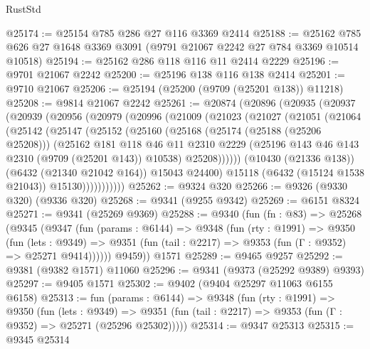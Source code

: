 \begin{lexlean}{RustStd}
\begin{coremodule}
@25174 := @25154 @785 @286 @27 @116 @3369 @2414
@25188 := @25162 @785 @626 @27 @1648 @3369 @3091 (@9791 @21067 @2242 @27 @784 @3369 @10514 @10518)
@25194 := @25162 @286 @118 @116 @11 @2414 @2229
@25196 := @9701 @21067 @2242
@25200 := @25196 @138 @116 @138 @2414
@25201 := @9710 @21067
@25206 := @25194 (@25200 (@9709 (@25201 @138)) @11218)
@25208 := @9814 @21067 @2242
@25261 := @20874
    (@20896
      (@20935
        (@20937
          (@20939
            (@20956
              (@20979
                (@20996
                  (@21009
                    (@21023
                      (@21027
                        (@21051
                          (@21064
                            (@25142
                              (@25147
                                (@25152
                                  (@25160
                                    (@25168
                                      (@25174 (@25188 (@25206 @25208)))
                                      (@25162
                                        @181
                                        @118
                                        @46
                                        @11
                                        @2310
                                        @2229
                                        (@25196 @143 @46 @143 @2310 (@9709 (@25201 @143)) @10538)
                                        @25208))))))
                            (@10430 (@21336 @138))
                            (@6432 (@21340 @21042 @164))
                            @15043
                            @24400)
                          @15118
                          (@6432 (@15124 @1538 @21043))
                          @15130)))))))))))
@25262 := @9324 @320
@25266 := @9326 (@9330 @320) (@9336 @320)
@25268 := @9341 (@9255 @9342)
@25269 := @6151 @8324
@25271 := @9341 (@25269 @9369)
@25288 := @9340
    (fun (fn : @83) =>
    @25268
      (@9345
        (@9347
          (fun (params : @6144) =>
          @9348
            (fun (rty : @1991) =>
            @9350
              (fun (lets : @9349) =>
              @9351 (fun (tail : @2217) => @9353 (fun (Γ : @9352) => @25271 @9414))))))
        @9459))
    @1571
@25289 := @9465 @9257
@25292 := @9381 (@9382 @1571) @11060
@25296 := @9341 (@9373 (@25292 @9389) @9393)
@25297 := @9405 @1571
@25302 := @9402 (@9404 @25297 @11063 @6155 @6158)
@25313 := fun (params : @6144) =>
  @9348
    (fun (rty : @1991) =>
    @9350
      (fun (lets : @9349) =>
      @9351 (fun (tail : @2217) => @9353 (fun (Γ : @9352) => @25271 (@25296 @25302)))))
@25314 := @9347 @25313
@25315 := @9345 @25314

\end{coremodule}
\end{lexlean}
